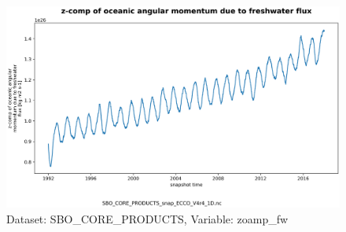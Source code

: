\begin{figure}[H]
\centering
\includegraphics[scale=0.55]{../images/plots/v4r4/oneD_plots/SBO_Core_Products/zoamp_fw.png}
\caption{Dataset: SBO\_CORE\_PRODUCTS, Variable: zoamp\_fw}
\label{tab:table-SBO_CORE_PRODUCTS_zoamp_fw-Plot}
\end{figure}
\newpage